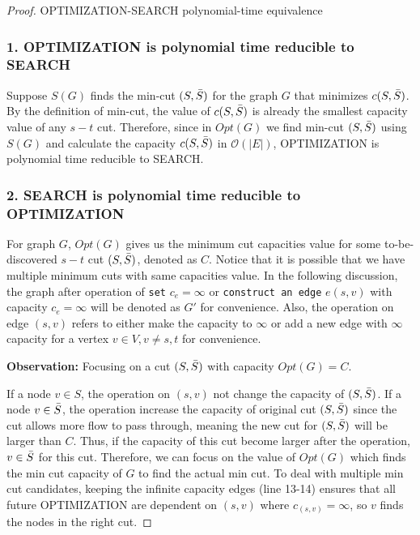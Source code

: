 \documentclass[openany]{article}
\begin{document}
\begin{proof}{}{OPTIMIZATION-SEARCH polynomial-time equivalence}
    
\subsubsection*{1. OPTIMIZATION is polynomial time reducible to SEARCH}
Suppose $S(G)$ finds the min-cut $(S,\Bar{S})$ for the graph $G$ that minimizes $c(S,\Bar{S})$. By the definition of min-cut, the value of $c(S,\Bar{S})$ is already the smallest capacity value of any $s-t$ cut. Therefore, since in $Opt(G)$ we find min-cut $(S,\Bar{S})$ using $S(G)$ and calculate the capacity $c(S,\Bar{S})$ in $\mathcal{O}(|E|)$,  OPTIMIZATION is polynomial time reducible to SEARCH.

\subsubsection*{2. SEARCH is polynomial time reducible to OPTIMIZATION}

For graph $G$, $Opt(G)$ gives us the minimum cut capacities value for some to-be-discovered $s-t$ cut $(S, \Bar{S})$, denoted as $C$. Notice that it is possible that we have multiple minimum cuts with same capacities value. In the following discussion, the graph after operation of \texttt{set} $c_e = \infty$ or \texttt{construct an edge} $e(s,v)$ with capacity $c_e = \infty$ will be denoted as $G'$ for convenience. Also, the operation on edge $(s,v)$ refers to either make the capacity to $\infty$ or add a new edge with $\infty$ capacity for a vertex $v\in V, v\neq s, t$ for convenience.

\textbf{Observation:} Focusing on a cut $(S,\Bar{S})$ with capacity $Opt(G) = C$.

If a node $v\in S$, the operation on $(s,v)$ not change the capacity of $(S,\Bar{S})$. If a node $v \in \Bar{S}$, the operation increase the capacity of original cut $(S,\Bar{S})$ since the cut allows more flow to pass through, meaning the new cut for $(S,\Bar{S})$ will be larger than $C$. Thus, if the capacity of this cut become larger after the operation, $v \in \Bar{S}$ for this cut. Therefore, we can focus on the value of $Opt(G)$ which finds the min cut capacity of $G$ to find the actual min cut. To deal with multiple min cut candidates, keeping the infinite capacity edges (line 13-14) ensures that all future OPTIMIZATION are dependent on $(s,v)$ where $c_{(s,v)}=\infty$, so $v$ finds the nodes in the right cut. 


\end{proof}
\end{document}
